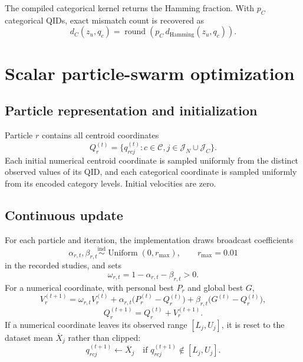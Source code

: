 \documentclass[11pt,a4paper]{article}
\begin{document}
The compiled categorical kernel returns the Hamming fraction.  With $p_C$
categorical QIDs, exact mismatch count is recovered as
\begin{equation}
d_C(z_u,q_c)=\operatorname{round}\!\left(
p_C\,d_{\mathrm{Hamming}}(z_u,q_c)\right).
\tag{36}
\end{equation}

\section{Scalar particle-swarm optimization}

\subsection{Particle representation and initialization}

Particle $r$ contains all centroid coordinates
\[
Q_r^{(t)}=\{q_{rcj}^{(t)}:c\in\mathcal C,
j\in\mathcal J_N\cup\mathcal J_C\}.
\]
Each initial numerical centroid coordinate is sampled uniformly from the
distinct observed values of its QID, and each categorical coordinate is
sampled uniformly from its encoded category levels.  Initial velocities are
zero.

\subsection{Continuous update}

For each particle and iteration, the implementation draws broadcast
coefficients
\begin{equation}
\alpha_{r,t},\beta_{r,t}\overset{\mathrm{ind}}{\sim}
\operatorname{Uniform}(0,r_{\max}),
\qquad r_{\max}=0.01
\tag{37}
\end{equation}
in the recorded studies, and sets
\begin{equation}
\omega_{r,t}=1-\alpha_{r,t}-\beta_{r,t}>0.
\tag{38}
\end{equation}
For a numerical coordinate, with personal best $P_r$ and global best $G$,
\begin{equation}
V_{r}^{(t+1)}=
\omega_{r,t}V_r^{(t)}
+\alpha_{r,t}\bigl(P_r^{(t)}-Q_r^{(t)}\bigr)
+\beta_{r,t}\bigl(G^{(t)}-Q_r^{(t)}\bigr),
\tag{39}
\end{equation}
\begin{equation}
Q_r^{(t+1)}=Q_r^{(t)}+V_r^{(t+1)}.
\tag{40}
\end{equation}
If a numerical coordinate leaves its observed range
$[L_j,U_j]$, it is reset to the dataset mean $\overline X_j$ rather than
clipped:
\begin{equation}
q_{rcj}^{(t+1)}\leftarrow\overline X_j
\quad\text{if }q_{rcj}^{(t+1)}\notin[L_j,U_j].
\tag{41}
\end{equation}
\end{document}
